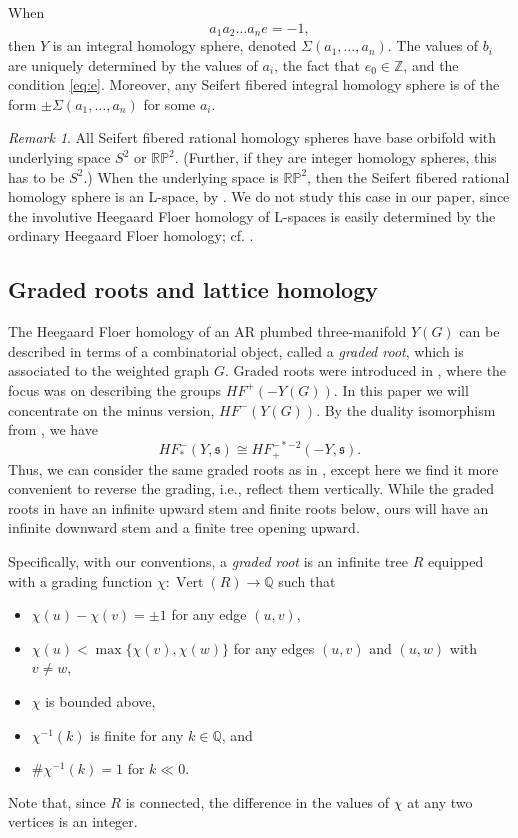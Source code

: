 \documentclass[11 pt]{amsart}
\theoremstyle{remark}
\newtheorem {remark}[theorem]{Remark}
\newcommand\Z{\mathbb{Z}}
\newcommand\Q{\mathbb{Q}}
\def\s{\mathfrak s}
\def\HF {\mathit{HF}}
\newcommand\HFp {\HF^+}
\newcommand \HFm {\HF^-}
\def\rp{\mathbb{RP}}
\def\Vert{\operatorname{Vert}}
\begin{document}
When
\begin{equation}
\label{eq:e}
 a_1 a_2 \dots a_n e = -1,
 \end{equation}
then $Y$ is an integral homology sphere, denoted $\Sigma(a_1, \dots, a_n)$. The values of $b_i$ are uniquely determined by the values of $a_i$, the fact that $e_0 \in \Z$, and the condition \eqref{eq:e}. Moreover, any Seifert fibered integral homology sphere is of the form $\pm \Sigma(a_1, \dots, a_n)$ for some $a_i$.

\begin{remark}
All Seifert fibered rational homology spheres have base orbifold with underlying space $S^2$ or $\rp^2$. (Further, if they are integer homology spheres, this has to be $S^2$.) When the underlying space is $\rp^2$, then the Seifert fibered rational homology sphere is an L-space, by \cite[Proposition 18]{BoyerGordonWatson}. We do not study this case in our paper, since the involutive Heegaard Floer homology of L-spaces is easily determined by the ordinary Heegaard Floer homology; cf. \cite[Corollary 4.8]{HMinvolutive}.
\end{remark}

\subsection{Graded roots and lattice homology}
\label{sec:lattice}
The Heegaard Floer homology of an AR plumbed three-manifold $Y(G)$ can be described in terms of a combinatorial object, called a {\em graded root}, which is associated to the weighted graph $G$. Graded roots were introduced in \cite{NemethiOS}, where the focus was on describing the groups $\HFp(-Y(G))$. In this paper we will concentrate on the minus version, $\HFm(Y(G))$. By the duality isomorphism from \cite[Proposition 7.11]{HolDiskFour}, we have
\begin{equation}
\label{eq:dualHF}
\HF_*^{-}(Y, \s) \cong \HF_+^{-*-2}(-Y, \s).
\end{equation}
Thus, we can consider the same graded roots as in \cite{NemethiOS}, except here we find it more convenient to reverse the grading, i.e., reflect them vertically. While the graded roots in \cite{NemethiOS} have an infinite upward stem and finite roots below, ours will have an infinite downward stem and a finite tree opening upward.

Specifically, with our conventions, a {\em graded root} is an infinite tree $R$ equipped with a grading function $\chi: \Vert(R) \to \Q$ such that
\begin{itemize}
\item $\chi(u) - \chi(v) = \pm 1$ for any edge $(u, v)$,
\item $\chi(u) < \max\{\chi(v), \chi(w)\}$ for any edges $(u,v)$ and $(u,w)$ with $v \neq w$,
\item $\chi$ is bounded above, 
\item $\chi^{-1}(k)$ is finite for any $k \in \Q$, and
\item $\# \chi^{-1}(k)=1$ for $k \ll 0$.
\end{itemize}
Note that, since $R$ is connected, the difference in the values of $\chi$ at any two vertices is an integer.
\end{document}
